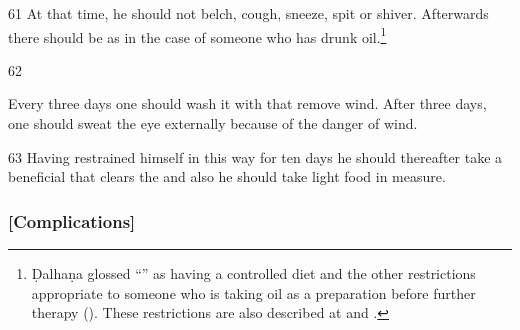 \begin{translation}
    \item[61]
    At that time, he should not belch, cough, sneeze, spit or shiver.  Afterwards there should be 
     as in the case of someone who has drunk 
    oil.\footnote{Ḍalhaṇa glossed “” as having a controlled diet 
    and 
    the other restrictions appropriate to someone who is taking oil as a preparation before 
    further 
    therapy (). These restrictions are also described at  
    and   .}
    
    
    \item[62]
    
    Every three days one should wash it with 
     that remove wind.
    After three days, one should sweat the eye externally because of the danger of wind. 
    
    \item[63]
    Having restrained himself in this way for ten days he should thereafter take a beneficial 
     that clears the  and also he should take light food 
    in 
    measure.
    
\end{translation}

\subsubsection{[Complications]}


